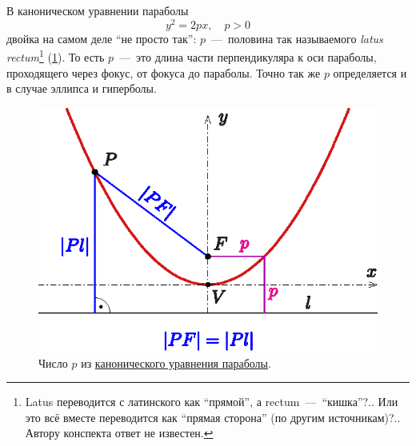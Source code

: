 \documentclass[a4paper,12pt]{article}
\begin{document}
  В каноническом уравнении параболы
  \[
    y^2 = 2px,\quad p > 0
  \]
  двойка на самом деле ``не просто так'': $p$~---~половина так называемого \emph{latus rectum}\footnote{Latus переводится с латинского как ``прямой'', а rectum~---~``кишка''?.. Или это всё вместе переводится как ``прямая сторона'' (по другим источникам)?.. Автору конспекта ответ не известен.} (\ref{fig:semi_latus_rectum}).
  То есть $p$~---~это длина части перпендикуляра к оси параболы, проходящего через фокус, от фокуса до параболы.
  Точно так же $p$ определяется и в случае эллипса и гиперболы.
  
  \begin{figure}[h]
    \centering

    \begin{minipage}[c]{0.4\textwidth}
      \includegraphics[width=\textwidth]{semi_latus_rectum}
    \end{minipage}\hfill
    \begin{minipage}[c]{0.55\textwidth}
      \caption{Число $p$ из \href{https://en.wikipedia.org/wiki/Parabola}{канонического уравнения параболы}.}
      \label{fig:semi_latus_rectum}
    \end{minipage}
  \end{figure}
\end{document}
